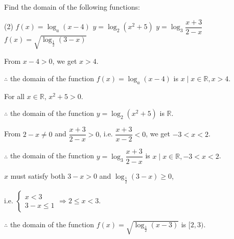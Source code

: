 \documentclass{report}
\begin{document}
\begin{question}
	Find the domain of the following functions:
	\begin{tasks}[label=(\alph*)](2)
		\task $f(x)=\log _a(x-4)$
		\task $y=\log _2\left(x^2+5\right)$
		\task $y=\log _3 \dfrac{x+3}{2-x}$
		\task $f(x)=\sqrt{\log _{\frac{1}{2}}(3-x)}$
	\end{tasks}
	
	\sol{}
	\begin{tasks}[label=(\alph*)]
		\task From $x-4>0$, we get $x>4$. 
		                
		$\therefore$ the domain of the function $f(x)=\log _a(x-4)$ is ${x \mid x \in \mathbb{R}, x>4}$.
		
		\task For all $x \in \mathbb{R}$, $x^2+5>0$. 
		                
		$\therefore$ the domain of the function $y=\log _2\left(x^2+5\right)$ is $\mathbb{R}$.
		                
		\task From $2-x \neq 0$ and $\dfrac{x+3}{2-x}>0$, i.e. $\dfrac{x+3}{x-2}<0$, we get $-3<x<2$. 
		                
		$\therefore$ the domain of the function $y=\log _3 \dfrac{x+3}{2-x}$ is ${x \mid x \in \mathbb{R}, -3<x<2}$.
		                
		\task $x$ must satisfy both $3-x>0$ and $\log _{\frac{1}{2}}(3-x) \geq 0$, 
		                
		i.e. $\left\{\begin{array}{c}x<3 \\ 3-x \leq 1\end{array} \Rightarrow 2 \leq x<3\right.$. 
		                
		$\therefore$ the domain of the function $f(x)=\sqrt{\log _{\frac{1}{2}}(x-3)}$ is $[2,3)$.
			\end{tasks}
			\end{question}
			
\end{document}
